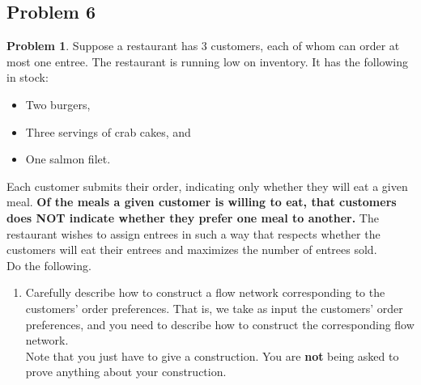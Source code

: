 \documentclass[11pt]{article}
\theoremstyle{definition}
\theoremstyle{definition}
\newtheorem{required}{Problem}
\theoremstyle{definition}
\begin{document}
\subsection{Problem 6}
\begin{required}
Suppose a restaurant has $3$ customers, each of whom can order at most one entree. The restaurant is running low on inventory. It has the following in stock:
\begin{itemize}
\item Two burgers,
\item Three servings of crab cakes, and
\item One salmon filet.
\end{itemize} 

\noindent Each customer submits their order, indicating only whether they will eat a given meal. \textbf{Of the meals a given customer is willing to eat, that customers does NOT indicate whether they prefer one meal to another.} The restaurant wishes to assign entrees in such a way that respects whether the customers will eat their entrees and maximizes the number of entrees sold. \\

\noindent Do the following.
\begin{enumerate}[label=(\alph*)]
\subsubsection{Problem 6\ref{S114a}}
\item \label{S114a} Carefully describe how to construct a flow network corresponding to the customers' order preferences. That is, we take as input the customers' order preferences, and you need to describe how to construct the corresponding flow network. \\

\noindent Note that you just have to give a construction. You are \textbf{not} being asked to prove anything about your construction.


\end{enumerate}
\end{required}
\end{document}
